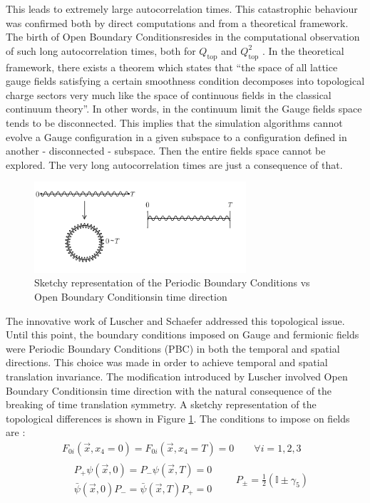 \documentclass[english, LaM, oneside, noexaminfo]{sapthesis}
\newcommand{\obc}{Open Boundary Conditions}
\begin{document}
This leads to extremely large autocorrelation times.
\newline
This catastrophic behaviour was confirmed both by direct computations and from a theoretical framework.
The birth of \obc\space resides in the computational observation of such long autocorrelation times, both for $Q_\text{top}$ \cite{investigatin-critical-slowing-down} and $Q_\text{top}^2$ \cite{critical-slowing-down-error-analysis}. 
In the theoretical framework, there exists a theorem \cite{Topology-WilsonFlow-HMC} which states that ``the space of all lattice gauge fields satisfying a certain smoothness condition decomposes into topological charge sectors very much like the space of continuous fields in the classical continuum theory''.
In other words, in the continuum limit the Gauge fields space tends to be disconnected.
This implies that the simulation algorithms cannot evolve a Gauge configuration in a given subspace to a configuration defined in another - disconnected - subspace.
Then the entire fields space cannot be explored. 
The very long autocorrelation times are just a consequence of that.
\begin{figure}[h!]
    \centering
    \includegraphics[width=0.7\textwidth]{imgs-MSc-thesis/torus-obc.png}
    \caption{Sketchy representation of the Periodic Boundary Conditions vs \obc\space in time direction}
    \label{fig:torus}
\end{figure}
\newline
The innovative work of Luscher and Schaefer addressed this topological issue.
Until this point, the boundary conditions imposed on Gauge and fermionic fields were Periodic Boundary Conditions (PBC) in both the temporal and spatial directions.
This choice was made in order to achieve temporal and spatial translation invariance.
The modification introduced by Luscher involved \obc\space in time direction with the natural consequence of the breaking of time translation symmetry.
A sketchy representation of the topological differences is shown in Figure \ref{fig:torus}.
The conditions to impose on fields are \cite{OBC_top}:
\begin{equation*}
    \begin{gathered}
        F_{0i}(\vec x, x_4=0) = F_{0i}(\vec x, x_4=T) = 0 \qquad \forall i = 1,2,3 \\
        \begin{aligned}
            & P_+ \psi (\vec x, 0) = P_- \psi (\vec x, T) = 0 \\
            & \bar\psi (\vec x, 0) P_- = \bar\psi (\vec x, T) P_+ = 0 
        \end{aligned}
        \quad\quad P_{\pm} = \frac{1}{2}\left(\mathbb{I} \pm \gamma_5 \right)
    \end{gathered}
\end{equation*}
\end{document}
